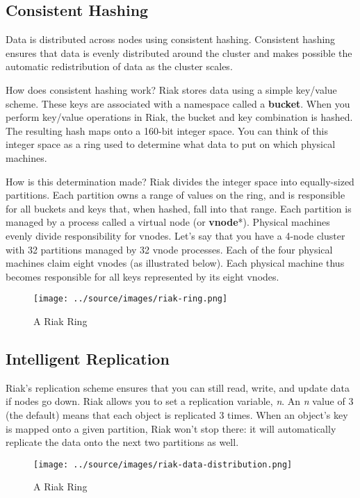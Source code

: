 \documentclass[letter]{book}
\begin{document}
\subsection{Consistent Hashing}\label{consistent-hashing}

Data is distributed across nodes using consistent hashing. Consistent hashing ensures that data is evenly distributed around the cluster and makes possible the automatic redistribution of data as the cluster scales.

How does consistent hashing work? Riak stores data using a simple key/value scheme. These keys are associated with a namespace called a \textbf{bucket}. When you perform key/value operations in Riak, the bucket and key combination is hashed. The resulting hash maps onto a 160-bit integer space. You can think of this integer space as a ring used to determine what data to put on which physical machines.

How is this determination made? Riak divides the integer space into equally-sized partitions. Each partition owns a range of values on the ring, and is responsible for all buckets and keys that, when hashed, fall into that range. Each partition is managed by a process called a virtual node (or \textbf{vnode}*). Physical machines evenly divide responsibility for vnodes. Let's say that you have a 4-node cluster with 32 partitions managed by 32 vnode processes. Each of the four physical machines claim eight vnodes (as illustrated below). Each physical machine thus becomes responsible for all keys represented by its eight vnodes.

\begin{figure}[htbp]
\centering
\texttt{[image: ../source/images/riak-ring.png]}
\caption{A Riak Ring}
\end{figure}

\subsection{Intelligent Replication}\label{intelligent-replication}

Riak's replication scheme ensures that you can still read, write, and update data if nodes go down. Riak allows you to set a replication variable, \emph{n}. An \emph{n} value of 3 (the default) means that each object is replicated 3 times. When an object's key is mapped onto a given partition, Riak won't stop there: it will automatically replicate the data onto the next two partitions as well.

\begin{figure}[htbp]
\centering
\texttt{[image: ../source/images/riak-data-distribution.png]}
\caption{A Riak Ring}
\end{figure}
\end{document}
